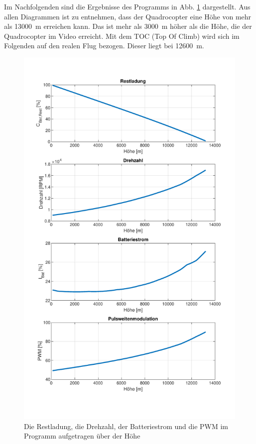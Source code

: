 Im Nachfolgenden sind die Ergebnisse des Programms in Abb. \ref{abb:ergebnisse_russland} dargestellt. Aus allen Diagrammen ist zu entnehmen, dass der Quadrocopter eine Höhe von mehr als \SI{13000}{m} erreichen kann. Das ist mehr als \SI{3000}{m} höher als die Höhe, die der Quadrocopter im Video erreicht. Mit dem TOC (Top Of Climb) wird sich im Folgenden auf den realen Flug bezogen. Dieser liegt bei \SI{12600}{m}.\\
\begin{figure}[H]
\centering
	\includegraphics{Diagramme/Russland.pdf}
	\caption{Die Restladung, die Drehzahl, der Batteriestrom und die PWM im Programm aufgetragen über der Höhe}
	\label{abb:ergebnisse_russland}
\end{figure}
